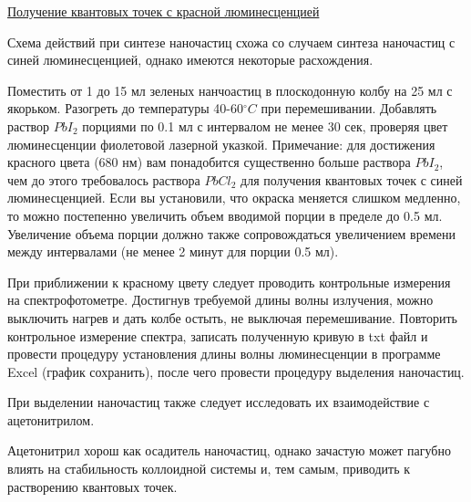 \underline{Получение квантовых точек с красной люминесценцией}

Схема действий при синтезе наночастиц схожа со случаем синтеза наночастиц с синей люминесценцией, однако имеются некоторые расхождения.

Поместить от 1 до 15 мл зеленых нанчоастиц в плоскодонную колбу на 25 мл с якорьком. Разогреть до температуры 40-60$^\circ C$ при перемешивании. Добавлять раствор $PbI_2$ порциями по 0.1 мл с интервалом не менее 30 сек, проверяя цвет люминесценции фиолетовой лазерной указкой. Примечание: для достижения красного цвета (680  нм) вам понадобится существенно больше раствора $PbI_2$, чем до этого требовалось раствора $PbCl_2$ для получения квантовых точек с синей люминесценцией. Если вы установили, что окраска меняется слишком медленно, то можно постепенно увеличить объем вводимой порции в пределе до 0.5 мл. Увеличение объема порции должно также сопровождаться увеличением времени между интервалами (не менее 2 минут для порции 0.5 мл).

При приближении к красному цвету следует проводить контрольные измерения на спектрофотометре. Достигнув требуемой длины волны излучения, можно выключить нагрев и дать колбе остыть, не выключая перемешивание. Повторить контрольное измерение спектра, записать полученную кривую в txt файл и провести процедуру установления длины волны люминесценции в программе Excel (график сохранить), после чего провести процедуру выделения наночастиц.

При выделении наночастиц также следует исследовать их взаимодействие с ацетонитрилом.

Ацетонитрил хорош как осадитель наночастиц, однако зачастую может пагубно влиять на стабильность коллоидной системы и, тем самым, приводить к растворению квантовых точек.